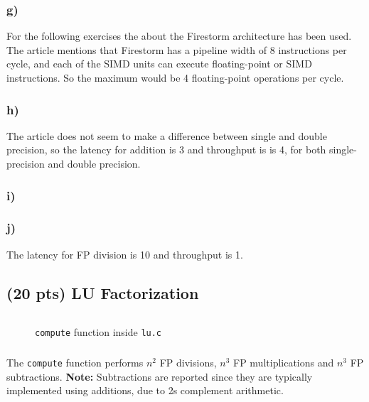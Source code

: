 \documentclass[tikz,14pt,fleqn]{article}
\begin{document}
\subsubsection*{g)}
For the following exercises the  about the Firestorm architecture has been used. The article mentions that Firestorm has a pipeline width of 8 instructions per cycle, and each of the SIMD units can execute floating-point or SIMD instructions. So the maximum would be 4 floating-point operations per cycle.
\subsubsection*{h)}
The article does not seem to make a difference between single and double precision, so the latency for addition is 3 and throughput is is 4, for both single-precision and double precision.
\subsubsection*{i)}

\subsubsection*{j)}
The latency for FP division is 10 and throughput is 1.


\subsection{(20 pts) LU Factorization}
\begin{figure}[h!]
    \inputminted[fontsize=\scriptsize, linenos, bgcolor=CODEBG, firstline=57, lastline=70]{C}{../ex2/lu.c}
    \caption{\texttt{compute} function inside \texttt{lu.c}}
\end{figure}
\subsubsection{} %

\subsubsection{} %
The \texttt{compute} function performs $n^2$ FP divisions, $n^3$ FP multiplications and $n^3$ FP subtractions. \textbf{Note:} Subtractions are reported since they are typically implemented using additions, due to 2s complement arithmetic.
\end{document}
